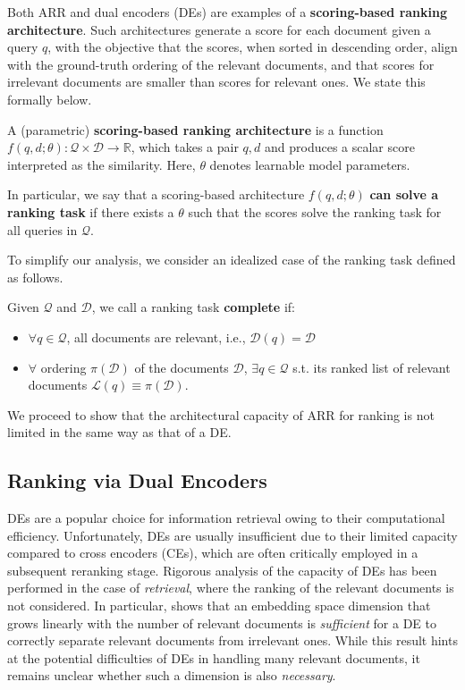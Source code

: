 \documentclass[11pt, a4paper, onecolumn, confidential, copyright, gdm]{google}
\begin{document}
Both ARR and dual encoders (DEs) are examples of a \textbf{scoring-based ranking architecture}. Such architectures generate a score for each document given a query $q$, with the objective that the scores, when sorted in descending order, align with the ground-truth ordering of the relevant documents, and that scores for irrelevant documents are smaller than scores for relevant ones. We state this formally below.
\begin{definition}
    A (parametric) \textbf{scoring-based ranking architecture} is a function $f(q, d; \theta): \mathcal{Q} \times \mathcal{D} \rightarrow \mathbb{R}$, which takes a pair $q, d$ and produces a scalar score interpreted as the similarity. Here, $\theta$ denotes learnable model parameters.
\end{definition}

\noindent In particular, we say that a scoring-based architecture $f(q, d; \theta)$ \textbf{can solve a ranking task} if there exists a $\theta$ such that the scores solve the ranking task for all queries in $\mathcal{Q}$.

To simplify our analysis, we consider an idealized case of the ranking task defined as follows.
\begin{definition}
    Given $\mathcal{Q}$ and $\mathcal{D}$, we call a ranking task \textbf{complete} if:
    \begin{itemize}[align=left,leftmargin=*,itemsep=0pt,topsep=0pt]
        \item $\forall q \in \mathcal{Q}$, all documents are relevant, i.e., $\mathcal{D}(q) = \mathcal{D}$
        \item $\forall$ ordering $\pi(\mathcal{D})$ of the documents $\mathcal{D}$, $\exists q \in \mathcal{Q}$ s.t. its ranked list of relevant documents $\mathscr{L}(q) \equiv \pi(\mathcal{D})$.
    \end{itemize}
\end{definition}
\noindent We proceed to show that the architectural capacity of ARR for ranking is not limited in the same way as that of a DE.

\subsection{Ranking via Dual Encoders}

DEs are a popular choice for information retrieval owing to their computational efficiency.
Unfortunately, DEs are usually insufficient due to their limited capacity compared to cross encoders (CEs), which are often critically employed in a subsequent reranking stage. 
Rigorous analysis of the capacity of DEs has been performed in the case of \emph{retrieval}, where the ranking of the relevant documents is not considered. 
In particular, \cite{guo2019breaking} shows that an embedding space dimension that grows linearly with the number of relevant documents is \emph{sufficient} for a DE to correctly separate relevant documents from irrelevant ones. 
While this result hints at the potential difficulties of DEs in handling many relevant documents, it remains unclear whether such a dimension is also \emph{necessary}.
\end{document}
